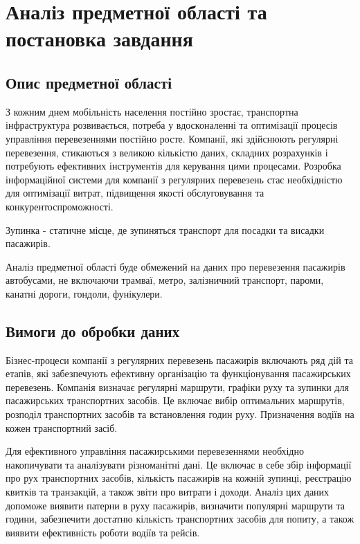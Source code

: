 \documentclass[oneside,14pt]{extarticle}
\begin{document}
\section{Аналіз предметної області та постановка завдання}
\subsection{Опис предметної області}
З кожним днем мобільність населення постійно зростає, транспортна інфраструктура розвивається, потреба у вдосконаленні та оптимізації процесів управління перевезеннями постійно росте. Компанії, які здійснюють регулярні перевезення, стикаються з великою кількістю даних, складних розрахунків і потребують ефективних інструментів для керування цими процесами. Розробка інформаційної системи для компанії з регулярних перевезень стає необхідністю для оптимізації витрат, підвищення якості обслуговування та конкурентоспроможності.

\begin{list}{-}{Специфікація важливих понять:}
\item Зупинка - статичне місце, де зупиняться транспорт для посадки та висадки пасажирів.
\end{list}

Аналіз предметної області буде обмежений на даних про перевезення пасажирів автобусами, не включаючи трамваї, метро, залізничний транспорт, пароми, канатні дороги, гондоли, фунікулери.

\subsection{Вимоги до обробки даних}
Бізнес-процеси компанії з регулярних перевезень пасажирів включають ряд дій та етапів, які забезпечують ефективну організацію та функціонування пасажирських перевезень. Компанія визначає регулярні маршрути, графіки руху та зупинки для пасажирських транспортних засобів. Це включає вибір оптимальних маршрутів, розподіл транспортних засобів та встановлення годин руху. Призначення водіїв на кожен транспортний засіб.

Для ефективного управління пасажирськими перевезеннями необхідно накопичувати та аналізувати різноманітні дані. Це включає в себе збір інформації про рух транспортних засобів, кількість пасажирів на кожній зупинці, реєстрацію квитків та транзакцій, а також звіти про витрати і доходи. Аналіз цих даних допоможе виявити патерни в руху пасажирів, визначити популярні маршрути та години, забезпечити достатню кількість транспортних засобів для попиту, а також виявити ефективність роботи водіїв та рейсів.
\end{document}
